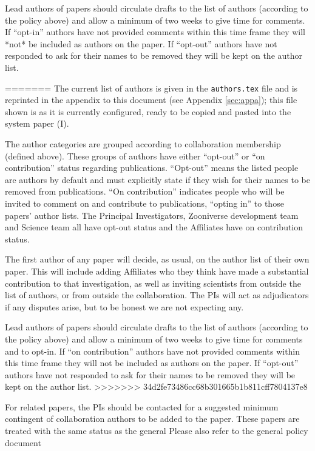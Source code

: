 \documentclass[a4paper]{article}
\begin{document}
Lead authors of \sw papers should circulate drafts to the list of \sw authors (according to the policy above) and allow a minimum of two weeks to give time for comments. If  ``opt-in'' authors have not provided comments within this time frame they will *not* be included as authors on the paper. If ``opt-out'' authors have not responded to ask for their names to be removed they will be kept on the author list.

=======
The current list of \sw authors is given in the \texttt{authors.tex} file and
is reprinted in the appendix to this document (see Appendix \ref{sec:appa});
this file shown is as it is currently configured, ready to be copied and
pasted into the \sw system paper (\sw I). 

\noindent The author categories are grouped according to collaboration
membership (defined above). These groups of authors have either  ``opt-out''
or ``on contribution'' status regarding \sw publications.  ``Opt-out'' means
the listed people are authors by default and must explicitly state if they
wish for their names to be removed from \sw publications. ``On contribution''
indicates people who will be invited to comment on and contribute to
publications, ``opting in'' to those papers' author lists. The Principal
Investigators, Zooniverse development team and \sw Science team all have
opt-out status and the \sw Affiliates have on contribution status.

The first author of any \sw paper will decide, as usual, on the author list of
their own paper. This will include adding Affiliates who they think have made
a substantial contribution to that investigation, as well as inviting
scientists from outside the list of \sw authors, or from outside the
collaboration.  The PIs will act as adjudicators if any disputes arise, but to
be honest we are not expecting any.

Lead authors of \sw papers should circulate drafts to the list of \sw authors
(according to the policy above) and allow a minimum of two weeks to give time
for comments and to opt-in. If  ``on contribution'' authors have not provided
comments within this time frame they will not be included as authors on the
paper. If ``opt-out'' authors have not responded to ask for their names to be
removed they will be kept on the author list.
>>>>>>> 34d2fe73486cc68b301665b1b811cff7804137e8

For \sw related papers, the \sw PIs should be contacted for a suggested minimum contingent of collaboration authors to be added to the paper. These papers are treated with the same status as the general \sw Please also refer to the general \sw policy document
\end{document}
